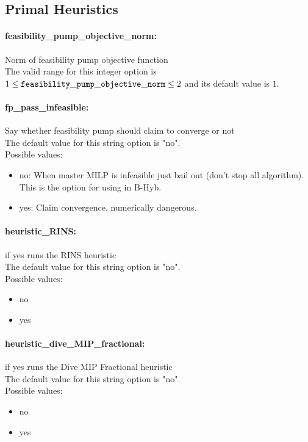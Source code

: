 \subsection{Primal Heuristics}
\label{sec:PrimalHeuristics}
\paragraph{feasibility\_pump\_objective\_norm:}\label{opt:feasibility_pump_objective_norm} Norm of feasibility pump objective function \\
 The valid range for this integer option is
$1 \le {\tt feasibility\_pump\_objective\_norm } \le 2$
and its default value is $1$.


\paragraph{fp\_pass\_infeasible:}\label{opt:fp_pass_infeasible} Say whether feasibility pump should claim to converge or not \\
 The default value for this string option is "no".
\\ 
Possible values:
\begin{itemize}
   \item no: When master MILP is infeasible just bail out (don't stop all algorithm). This is the option for using in B-Hyb.
   \item yes: Claim convergence, numerically dangerous.
\end{itemize}

\paragraph{heuristic\_RINS:}\label{opt:heuristic_RINS} if yes runs the RINS heuristic \\
 The default value for this string option is "no".
\\ 
Possible values:
\begin{itemize}
   \item no
   \item yes
\end{itemize}

\paragraph{heuristic\_dive\_MIP\_fractional:}\label{opt:heuristic_dive_MIP_fractional} if yes runs the Dive MIP Fractional heuristic \\
 The default value for this string option is "no".
\\ 
Possible values:
\begin{itemize}
   \item no
   \item yes
\end{itemize}

